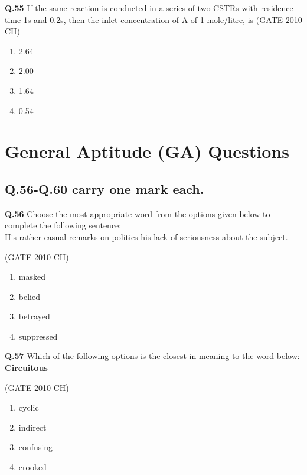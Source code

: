\documentclass[journal,12pt,onecolumn]{exam}
\theoremstyle{remark}
\begin{document}
\noindent
\textbf{Q.55}
 If the same reaction is conducted in a series of two CSTRs with residence time 1s and 0.2s, then the inlet concentration of A of 1 mole/litre, is
\hfill{(GATE 2010 CH)}\\

 \begin{enumerate}
     \item 2.64
     \item 2.00
     \item 1.64
     \item 0.54
     
 \end{enumerate}

\section{General Aptitude (GA) Questions}
\subsection{Q.56-Q.60 carry one mark each.}

\noindent
\textbf{Q.56}
 Choose the most appropriate word from the options given below to complete the following sentence:\\
 His rather casual remarks on politics \makebox[3cm]{\hrulefill} his lack of seriousness about the subject.
  
  \hfill{(GATE 2010 CH)}\\

  \begin{enumerate}
      \item masked
      \item belied
      \item betrayed
      \item suppressed
  \end{enumerate}

\noindent
\textbf{Q.57}
 Which of the following options is the closest in meaning to the word below:\\
     \textbf{Circuitous}
   
    \hfill{(GATE 2010 CH)}\\
 
 \begin{enumerate}
     \item cyclic
     \item indirect
     \item confusing
     \item crooked
 \end{enumerate}
\end{document}
